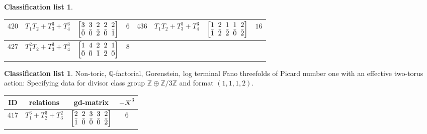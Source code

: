 \documentclass[pdftex]{sigma}%
\theoremstyle{definition}
\newtheorem{class-list}[thm]{Classification list}
\def\ZZ{{\mathbb Z}}
\def\QQ{{\mathbb Q}}
\numberwithin{equation}{section}
\begin{document}
\begin{class-list}
\begin{table}[h!]
\begin{tabu}{c|c|c|c||c|c|c|c}
\hline
${420}$&${T_{1}T_{2}+T_{3}^{3}+T_{4}^{3}}$
&$\arraycolsep=1mm\begin{bmatrix}{3} & {3} & {2} & {2} & {2} \\ {\bar{0}} & {\bar{0}} & {\bar{2}} & {\bar{0}} & {\bar{1}}\end{bmatrix}$&${6}$
&${436}$&${T_{1}T_{2}+T_{3}^{3}+T_{4}^{3}}$
&$\arraycolsep=1mm\begin{bmatrix}{1} & {2} & {1} & {1} & {2} \\ {\bar{1}} & {\bar{2}} & {\bar{2}} & {\bar{0}} & {\bar{2}}\end{bmatrix}$&${16}$
\\
\hline
${427}$&${T_{1}^{2}T_{2}+T_{3}^{3}+T_{4}^{3}}$
&$\arraycolsep=1mm\begin{bmatrix}{1} & {4} & {2} & {2} & {1} \\ {\bar{0}} & {\bar{0}} & {\bar{1}} & {\bar{2}} & {\bar{0}}\end{bmatrix}$&${8}$
\\
\end{tabu}\vspace{2mm}
\end{table}
\end{class-list}

\begin{class-list}
Non-toric, $\QQ$-factorial, Gorenstein, log terminal Fano
threefolds of Picard number one with an effective two-torus action:
Specifying data for divisor class group $\ZZ\oplus \ZZ/3\ZZ$ and
format $(1,1,1,2)$.
\begin{table}[h!]\centering\setlength{\tabcolsep}{5.5pt}
\renewcommand{\arraystretch}{1.35}\small\tabulinesep=1mm
\begin{tabu}{c|c|c|c}
\hline
ID&relations&gd-matrix&$-\mathcal{K}^3$
\\
\hline
${417}$&${T_{1}^{3}+T_{2}^{3}+T_{3}^{2}}$
&$\arraycolsep=1mm\begin{bmatrix}{2} & {2} & {3} & {3} & {2} \\ {\bar{1}} & {\bar{0}} & {\bar{0}} & {\bar{0}} & {\bar{2}}\end{bmatrix}$&${6}$
\\
\hline
\end{tabu}\vspace{4mm}
\end{table}
\end{class-list}
\end{document}
